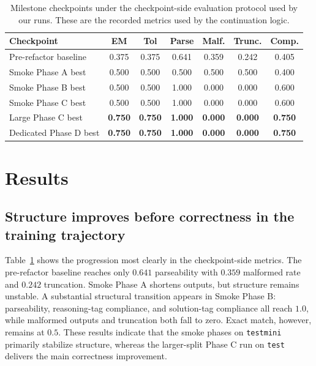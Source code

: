 \documentclass{article} %
\begin{document}
\begin{table}[t]
\centering
\small
\caption{Milestone checkpoints under the checkpoint-side evaluation protocol used by our runs. These are the recorded metrics used by the continuation logic.}
\label{tab:milestones}
\begin{tabular}{lcccccc}
\toprule
Checkpoint & EM & Tol & Parse & Malf. & Trunc. & Comp. \\
\midrule
Pre-refactor baseline & 0.375 & 0.375 & 0.641 & 0.359 & 0.242 & 0.405 \\
Smoke Phase A best & 0.500 & 0.500 & 0.500 & 0.500 & 0.500 & 0.400 \\
Smoke Phase B best & 0.500 & 0.500 & 1.000 & 0.000 & 0.000 & 0.600 \\
Smoke Phase C best & 0.500 & 0.500 & 1.000 & 0.000 & 0.000 & 0.600 \\
Large Phase C best & \textbf{0.750} & \textbf{0.750} & \textbf{1.000} & \textbf{0.000} & \textbf{0.000} & \textbf{0.750} \\
Dedicated Phase D best & \textbf{0.750} & \textbf{0.750} & \textbf{1.000} & \textbf{0.000} & \textbf{0.000} & \textbf{0.750} \\
\bottomrule
\end{tabular}
\end{table}

\section{Results}

\subsection{Structure improves before correctness in the training trajectory}

Table~\ref{tab:milestones} shows the progression most clearly in the checkpoint-side metrics. The pre-refactor baseline reaches only $0.641$ parseability with $0.359$ malformed rate and $0.242$ truncation. Smoke Phase A shortens outputs, but structure remains unstable. A substantial structural transition appears in Smoke Phase B: parseability, reasoning-tag compliance, and solution-tag compliance all reach $1.0$, while malformed outputs and truncation both fall to zero. Exact match, however, remains at $0.5$. These results indicate that the smoke phases on \texttt{testmini} primarily stabilize structure, whereas the larger-split Phase C run on \texttt{test} delivers the main correctness improvement.
\end{document}
